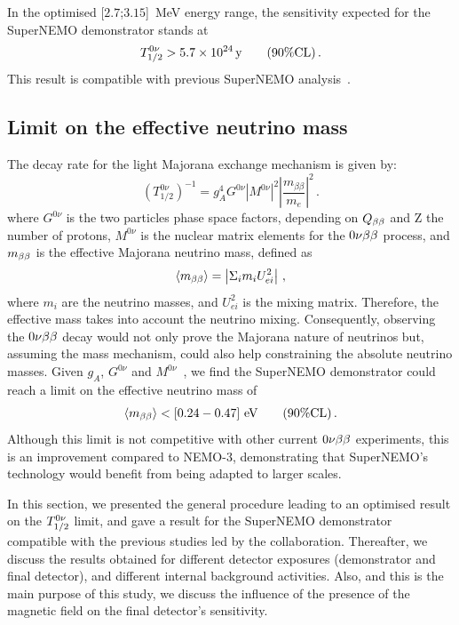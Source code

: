 In the optimised [$2.7$;$3.15$]~MeV energy range, the sensitivity expected for the SuperNEMO demonstrator stands at
\begin{equation}
T_{1/2}^{0\nu} > 5.7\times 10^{24}\,\text{y}\qquad (90\% \text{CL})\,.
\end{equation}
This result is compatible with previous SuperNEMO analysis~\cite{CalvezThesis}.


\subsection{Limit on the effective neutrino mass}

The decay rate for the light Majorana exchange mechanism is given by:
\begin{equation}
  (T_{1/2}^{0\nu})^{-1} = g_{A}^{4}G^{0\nu}|M^{0\nu}|^{2}\left\lvert\dfrac{m_{\beta\beta}}{m_{e}}\right\rvert^{2}\,.
\end{equation}
where $G^{0\nu}$ is the two particles phase space factors, depending on $Q_{\beta\beta}$ and Z the number of protons, $M^{0\nu}$ is the nuclear matrix elements for the $0\nu\beta\beta$ process, and $m_{\beta\beta}$ is the effective Majorana neutrino mass, defined as
\begin{equation}
  \langle m_{\beta\beta} \rangle = \left\vert \Sigma_{i}m_{i}U^{2}_{ei} \right\vert \,,
\end{equation}
where $m_{i}$ are the neutrino masses, and $U^{2}_{ei}$ is the mixing matrix.
Therefore, the effective mass takes into account the neutrino mixing.
Consequently, observing the $0\nu\beta\beta$ decay would not only prove the Majorana nature of neutrinos but, assuming the mass mechanism, could also help constraining the absolute neutrino masses.
Given $g_{A}$, $G^{0\nu}$ and $M^{0\nu}$~\cite{PhysRevC.85.034316,PhysRevC.83.034320}, we find the SuperNEMO demonstrator could reach a limit on the effective neutrino mass of
\begin{equation}
\langle m_{\beta\beta}\rangle < [0.24-0.47]~\text{eV}\qquad (90\% \text{CL})\,.
\end{equation}
Although this limit is not competitive with other current $0\nu\beta\beta$ experiments, this is an improvement compared to NEMO-$3$, demonstrating that SuperNEMO's technology would benefit from being adapted to larger scales.

In this section, we presented the general procedure leading to an optimised result on the $T_{1/2}^{0\nu}$ limit, and gave a result for the SuperNEMO demonstrator compatible with the previous studies led by the collaboration.
Thereafter, we discuss the results obtained for different detector exposures (demonstrator and final detector), and different internal background activities.
Also, and this is the main purpose of this study, we discuss the influence of the presence of the magnetic field on the final detector's sensitivity.


